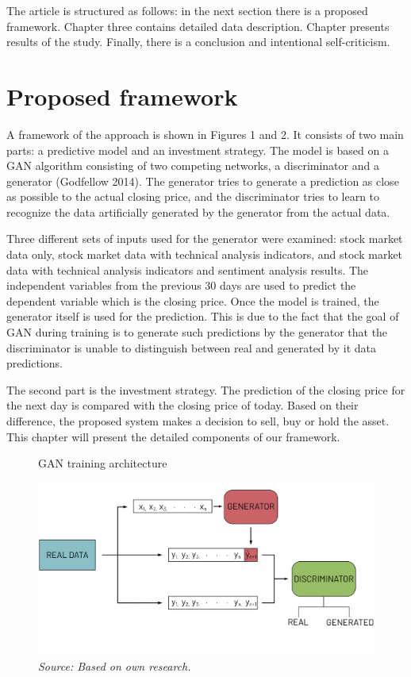 \documentclass[review]{elsarticle} %
\begin{document}
The article is structured as follows: in the next section there is a proposed framework. Chapter three contains detailed data description. Chapter presents results of the study. Finally, there is a conclusion and intentional self-criticism.

\section{Proposed framework}
A framework of the approach is shown in Figures 1 and 2. It consists of two main parts: a predictive model and an investment strategy. The model is based on a GAN algorithm consisting of two competing networks, a discriminator and a generator (Godfellow 2014). The generator tries to generate a prediction as close as possible to the actual closing price, and the discriminator tries to learn to recognize the data artificially generated by the generator from the actual data. 

Three different sets of inputs used for the generator were examined: stock market data only, stock market data with technical analysis indicators, and stock market data with technical analysis indicators and sentiment analysis results. The independent variables from the previous 30 days are used to predict the dependent variable which is the closing price. Once the model is trained, the generator itself is used for the prediction. This is due to the fact that the goal of GAN during training is to generate such predictions by the generator that the discriminator is unable to distinguish between real and generated by it data predictions.

The second part is the investment strategy. The prediction of the closing price for the next day is compared with the closing price of today. Based on their difference, the proposed system makes a decision to sell, buy or hold the asset. This chapter will present the detailed components of our framework. 

\begin{figure}[H]
\caption{GAN training architecture}
\includegraphics{rysunek1.png}
\caption*{\textit{Source: Based on own research.}}
\end{figure}
\end{document}
